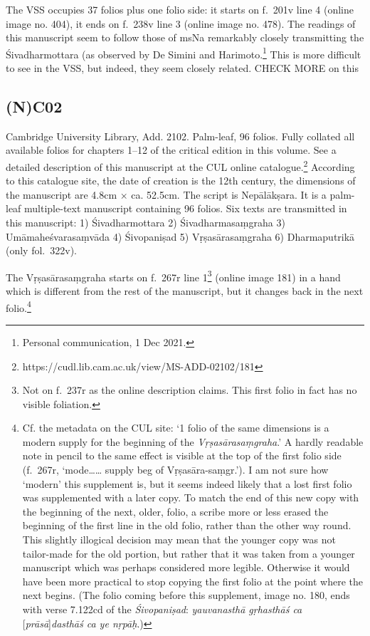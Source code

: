 \documentclass[]{article}
\begin{document}
The VSS occupies 37 folios plus one folio side: it starts on f.~201v
line 4 (online image no. 404), it ends on f.~238v line 3 (online image
no. 478). The readings of this manuscript seem to follow those of msNa
remarkably closely transmitting the Śivadharmottara (as observed by De
Simini and Harimoto.\footnote{Personal communication, 1 Dec 2021.} This
is more difficult to see in the VSS, but indeed, they seem closely
related. CHECK MORE on this

\hypertarget{nc02}{%
\subsection{(N)C02}\label{nc02}}

Cambridge University Library, Add. 2102. Palm-leaf, 96 folios. Fully
collated all available folios for chapters 1--12 of the critical edition
in this volume. See a detailed description of this manuscript at the CUL
online catalogue.\footnote{https://cudl.lib.cam.ac.uk/view/MS-ADD-02102/181}
According to this catalogue site, the date of creation is the 12th
century, the dimensions of the manuscript are 4.8cm × ca. 52.5cm. The
script is Nepālākṣara. It is a palm-leaf multiple-text manuscript
containing 96 folios. Six texts are transmitted in this manuscript: 1)
Śivadharmottara 2) Śivadharmasaṃgraha 3) Umāmaheśvarasaṃvāda 4)
Śivopaniṣad 5) Vṛṣasārasaṃgraha 6) Dharmaputrikā (only fol.~322v).

The Vṛṣasārasaṃgraha starts on f.~267r line 1\footnote{Not on f.~237r as
  the online description claims. This first folio in fact has no visible
  foliation.} (online image 181) in a hand which is different from the
rest of the manuscript, but it changes back in the next folio.\footnote{Cf.
  the metadata on the CUL site: `1 folio of the same dimensions is a
  modern supply for the beginning of the \emph{Vṛṣasārasaṃgraha}.' A
  hardly readable note in pencil to the same effect is visible at the
  top of the first folio side (f.~267r, `mode\ldots{}\ldots{} supply beg
  of Vṛṣasāra-saṃgr.'). I am not sure how `modern' this supplement is,
  but it seems indeed likely that a lost first folio was supplemented
  with a later copy. To match the end of this new copy with the
  beginning of the next, older, folio, a scribe more or less erased the
  beginning of the first line in the old folio, rather than the other
  way round. This slightly illogical decision may mean that the younger
  copy was not tailor-made for the old portion, but rather that it was
  taken from a younger manuscript which was perhaps considered more
  legible. Otherwise it would have been more practical to stop copying
  the first folio at the point where the next begins. (The folio coming
  before this supplement, image no. 180, ends with verse 7.122cd of the
  \emph{Śivopaniṣad}: \emph{yauvanasthā gṛhasthāś ca}
  {[}\emph{prāsā}{]}\emph{dasthāś ca ye nṛpāḥ}.)}
\end{document}
